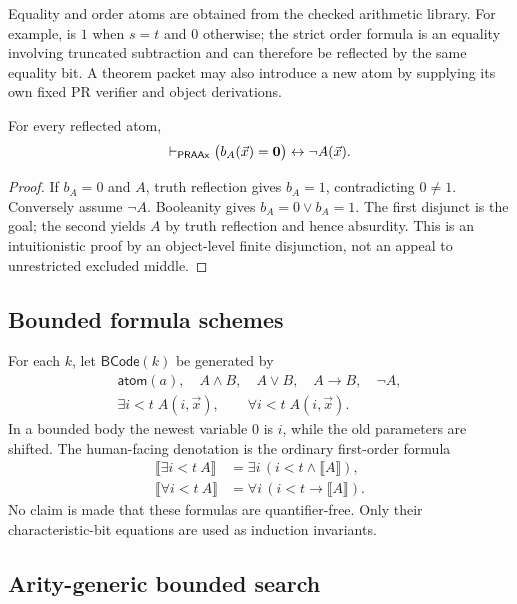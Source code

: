 Equality and order atoms are obtained from the checked arithmetic library.  For
example,  is \(1\) when \(s=t\) and \(0\) otherwise; the strict
order formula is an equality involving truncated subtraction and can therefore
be reflected by the same equality bit.  A theorem packet may also introduce a
new atom by supplying its own fixed PR verifier and object derivations.

\begin{lemma}
\label{lem:atomic-zero}
For every reflected atom,
\[
  \mathrel{\vdash_{\mathsf{PRAAx}}}
  \bigl(b_A(\vec x)=\mathbf{0}\bigr)\leftrightarrow\neg A(\vec x).
\]
\end{lemma}

\begin{proof}
If \(b_A=0\) and \(A\), truth reflection gives \(b_A=1\), contradicting
\(0\neq1\).  Conversely assume \(\neg A\).  Booleanity gives
\(b_A=0\vee b_A=1\).  The first disjunct is the goal; the second yields \(A\)
by truth reflection and hence absurdity.  This is an intuitionistic proof by an
object-level finite disjunction, not an appeal to unrestricted excluded middle.
\end{proof}

\subsection{Bounded formula schemes}

For each \(k\), let \(\mathsf{BCode}(k)\) be generated by
\[
\begin{array}{c}
  \mathsf{atom}(a),\quad A\wedge B,\quad A\vee B,\quad A\to B,
  \quad\neg A,\\[0.3em]
  \exists i<t\;A(i,\vec x),
  \qquad
  \forall i<t\;A(i,\vec x).
\end{array}
\]
In a bounded body the newest variable \(0\) is \(i\), while the old parameters
are shifted.  The human-facing denotation is the ordinary first-order formula
\[
\begin{aligned}
 \llbracket\exists i<t\ A\rrbracket
   &= \exists i\,(i<t\wedge\llbracket A\rrbracket),\\
 \llbracket\forall i<t\ A\rrbracket
   &= \forall i\,(i<t\to\llbracket A\rrbracket).
\end{aligned}
\]
No claim is made that these formulas are quantifier-free.  Only their
characteristic-bit equations are used as induction invariants.

\subsection{Arity-generic bounded search}

